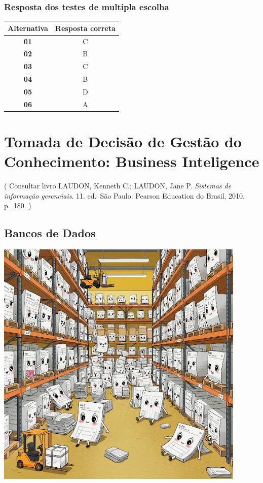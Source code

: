 \documentclass[
]{book}
\begin{document}
\subsection{Resposta dos testes de multipla escolha}\label{resposta-dos-testes-de-multipla-escolha-1}

\begin{longtable}[]{@{}cc@{}}
\toprule\noalign{}
Alternativa & Resposta correta \\
\midrule\noalign{}
\endhead
\bottomrule\noalign{}
\endlastfoot
\textbf{01} & C \\
\textbf{02} & B \\
\textbf{03} & C \\
\textbf{04} & B \\
\textbf{05} & D \\
\textbf{06} & A \\
\end{longtable}

\chapter{Tomada de Decisão de Gestão do Conhecimento: Business Inteligence}\label{tomada-de-decisuxe3o-de-gestuxe3o-do-conhecimento-business-inteligence}

( Consultar livro LAUDON, Kenneth C.; LAUDON, Jane P. \emph{Sistemas de informação gerenciais}. 11. ed.~São Paulo: Pearson Education do Brasil, 2010. p.~180. )

\section{Bancos de Dados}\label{bancos-de-dados}

\includegraphics[width=4.70833in,height=\textheight]{images/5-bi/01-banco-de-dados.jpg}
\end{document}
